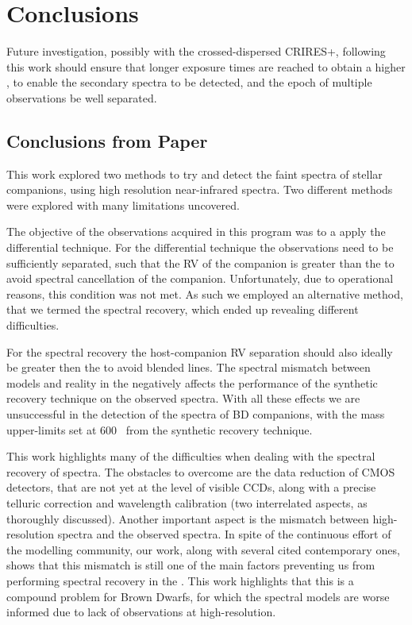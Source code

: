
\chapter{Conclusions}  %

\label{cha:conclusions}


Future investigation, possibly with the crossed-dispersed {CRIRES+}, following this work should ensure that longer exposure times are reached to obtain a higher \snr{}, to enable the secondary spectra to be detected, and the epoch of multiple observations be well separated.


\section{Conclusions from Paper}
\label{sec:conclusions}

This work explored two methods to try and detect the faint spectra of stellar companions, using high resolution near-infrared spectra.
Two different methods were explored with many limitations uncovered.

The objective of the observations acquired in this program was to a apply the differential technique.
For the differential technique the observations need to be sufficiently separated, such that the {RV} of the companion is greater than the {\fwhm} to avoid spectral cancellation of the companion.
Unfortunately, due to operational reasons, this condition was not met.
As such we employed an alternative method, that we termed the spectral recovery, which ended up revealing different difficulties.

For the spectral recovery the host-companion {RV} separation should also ideally be greater then the {\fwhm} to avoid blended lines.
The spectral mismatch between models and reality in the \nir{}negatively affects the performance of the synthetic recovery technique on the observed spectra.
With all these effects we are unsuccessful in the detection of the \nir{}spectra of {BD} companions, with the mass upper-limits set at 600~\Mjup{} from the synthetic recovery technique.

This work highlights many of the difficulties when dealing with the spectral recovery of \nir{}spectra.
The obstacles to overcome are the data reduction of \nir{}CMOS detectors, that are not yet at the level of visible CCDs, along with a precise telluric correction and wavelength calibration (two interrelated aspects, as thoroughly discussed).
Another important aspect is the mismatch between \nir{}high-resolution spectra and the observed spectra.
In spite of the continuous effort of the modelling community, our work, along with several cited contemporary ones, shows that this mismatch is still one of the main factors preventing us from performing spectral recovery in the \nir{}.
This work highlights that this is a compound problem for Brown Dwarfs, for which the spectral models are worse informed due to lack of observations at high-resolution.

